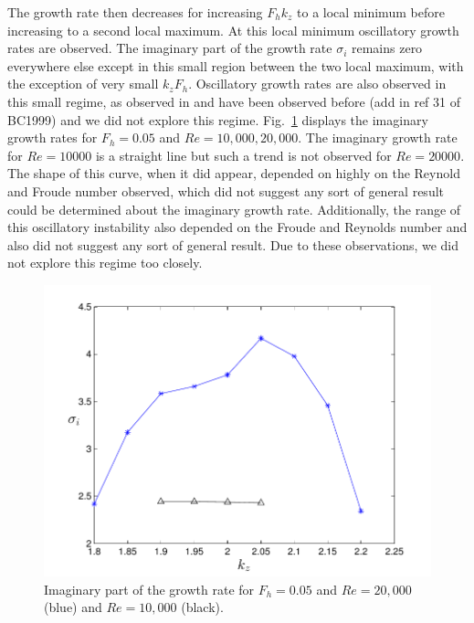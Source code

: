 The growth rate then decreases for increasing $F_{h}k_{z}$ to a local minimum before increasing to a second local maximum. At this local minimum oscillatory growth rates are observed. The imaginary part of the growth rate $\sigma_{i}$ remains zero everywhere else except in this small region between the two local maximum, with the exception of very small $k_{z}F_{h}$. Oscillatory growth rates are also observed in this small regime, as observed in \cite{bc1999} and have been observed before \cite{bc1999} (add in ref 31 of BC1999) and we did not explore this regime. Fig.~\ref{oscillatory_growth} displays the imaginary growth rates for $F_{h}=0.05$ and $Re=10{,}000, 20{,}000$. The imaginary growth rate for $Re=10000$ is a straight line but such a trend is not observed for $Re=20000$. The shape of this curve, when it did appear, depended on highly on the Reynold and Froude number observed, which did not suggest any sort of general result could be determined about the imaginary growth rate. Additionally, the range of this oscillatory instability also depended on the Froude and Reynolds number and also did not suggest any sort of general result. Due to these observations, we did not explore this regime too closely. 
\begin{figure}
\begin{center}
\includegraphics[scale=0.65]{oscillatory_growth}
\caption{Imaginary part of the growth rate for $F_{h}=0.05$ and $Re=20{,}000$ (blue) and $Re=10{,}000$ (black).}
\label{oscillatory_growth}
\end{center}
\end{figure} 

